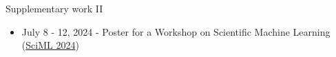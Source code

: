 \begin{frame}{Supplementary work II}
	\vspace{-7pt}
	
	\begin{tcolorbox}[
		skin=bicolor,
		colback=other, %
		colbacklower=other!20!white,
		title={Coming soon...},
		arc=2mm, %
		boxrule=0.5pt, %
		breakable, enhanced jigsaw,
		width=\linewidth,
		opacityback=0.1
		]
		
		\begin{itemize}[\textcolor{other}{$\blacktriangleright$}]
			\item July 8 - 12, 2024 - Poster for a Workshop on Scientific Machine Learning (\href{https://irma.math.unistra.fr/~micheldansac/SciML2024/participants.html}{SciML 2024})
		\end{itemize}
	\end{tcolorbox}
\end{frame}

